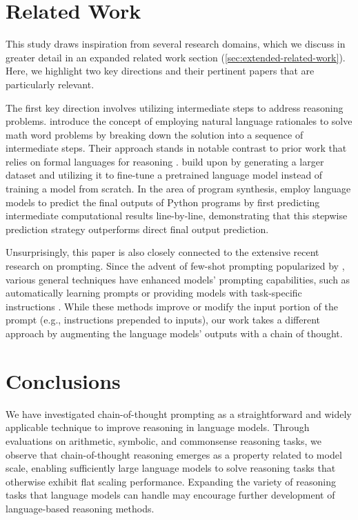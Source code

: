 \section{Related Work} This study draws inspiration from several research domains, which we discuss in greater detail in an expanded related work section (\cref{sec:extended-related-work}). Here, we highlight two key directions and their pertinent papers that are particularly relevant.

The first key direction involves utilizing intermediate steps to address reasoning problems. \cite{ling-etal-2017-program} introduce the concept of employing natural language rationales to solve math word problems by breaking down the solution into a sequence of intermediate steps. Their approach stands in notable contrast to prior work that relies on formal languages for reasoning \citep{roy-2016-reasoning, chiang-chen-2019-semantically, amini-etal-2019-mathqa, chen2019neural}. \citet{cobbe2021training} build upon \citet{ling-etal-2017-program} by generating a larger dataset and utilizing it to fine-tune a pretrained language model instead of training a model from scratch. In the area of program synthesis, \cite{nye2021show} employ language models to predict the final outputs of Python programs by first predicting intermediate computational results line-by-line, demonstrating that this stepwise prediction strategy outperforms direct final output prediction.

Unsurprisingly, this paper is also closely connected to the extensive recent research on prompting. Since the advent of few-shot prompting popularized by \citet{brown2020language}, various general techniques have enhanced models' prompting capabilities, such as automatically learning prompts \citep{lester-etal-2021-power} or providing models with task-specific instructions \citep{wei2021finetuned,sanh2021multitask,ouyang2022training}. While these methods improve or modify the input portion of the prompt (e.g., instructions prepended to inputs), our work takes a different approach by augmenting the language models' outputs with a chain of thought.

\section{Conclusions} We have investigated chain-of-thought prompting as a straightforward and widely applicable technique to improve reasoning in language models. Through evaluations on arithmetic, symbolic, and commonsense reasoning tasks, we observe that chain-of-thought reasoning emerges as a property related to model scale, enabling sufficiently large language models to solve reasoning tasks that otherwise exhibit flat scaling performance. Expanding the variety of reasoning tasks that language models can handle may encourage further development of language-based reasoning methods.

